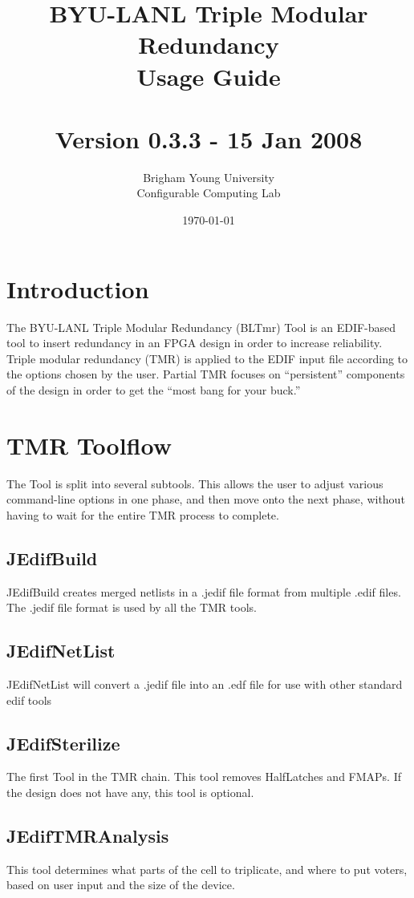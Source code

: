 \documentclass[english]{article}
\title{BYU-LANL Triple Modular Redundancy \\ Usage Guide \\ ~ \\
  Version 0.3.3 - 15 Jan 2008 \\  }
\author{Brigham Young University \\ Configurable Computing Lab}
\date{\today}
\begin{document}
\maketitle

\newpage
\tableofcontents
\newpage

\section{Introduction}
The BYU-LANL Triple Modular Redundancy (BLTmr) Tool is an EDIF-based tool to 
insert redundancy in an FPGA design in order to increase reliability. Triple 
modular redundancy (TMR) is applied to the EDIF input file according to the 
options chosen by the user. Partial TMR focuses on ``persistent'' components of 
the design in order to get the ``most bang for your buck.''

\section{TMR Toolflow}
The Tool is split into several subtools. This allows the user to adjust various 
command-line options in one phase, and then move onto the next phase, without
having to wait for the entire TMR process to complete.

\subsection{JEdifBuild}
JEdifBuild creates merged netlists in a .jedif file format from 
multiple .edif files. The .jedif file format is used by all the TMR tools.

\subsection{JEdifNetList}
JEdifNetList will convert a .jedif file into an .edf file for use with other
standard edif tools 

\subsection{JEdifSterilize}
The first Tool in the TMR chain. This tool removes HalfLatches and FMAPs. If the 
design does not have any, this tool is optional.

\subsection{JEdifTMRAnalysis}
This tool determines what parts of the cell to triplicate, and where to put voters,
based on user input and the size of the device.
\end{document}

